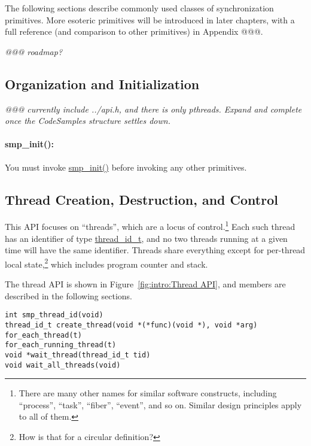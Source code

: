 The following sections describe commonly used classes of synchronization
primitives.
More esoteric primitives will be introduced in later chapters, with
a full reference (and comparison to other primitives) in
Appendix @@@.

\emph{@@@ roadmap?}

\subsection{Organization and Initialization}
\label{sec:intro:Organization and Initialization}

\emph{@@@ currently include ../api.h, and there is only pthreads.
Expand and complete once the CodeSamples structure settles down.}

\paragraph{smp\_init():}
You must invoke \url{smp_init()} before invoking any other primitives.

\subsection{Thread Creation, Destruction, and Control}
\label{sec:intro:Thread Creation, Destruction and Control}

This API focuses on ``threads'', which are a locus of control.\footnote{
	There are many other names for similar software constructs, including
	``process'', ``task'', ``fiber'', ``event'', and so on.
	Similar design principles apply to all of them.}
Each such thread has an identifier of type \url{thread_id_t},
and no two threads running at a given time will have the same
identifier.
Threads share everything except for per-thread local state,\footnote{
	How is that for a circular definition?}
which includes program counter and stack.

The thread API is shown in
Figure~\ref{fig:intro:Thread API}, and members are described in the
following sections.

\begin{figure*}[htbp] 
{ \scriptsize
\begin{verbatim}
int smp_thread_id(void)
thread_id_t create_thread(void *(*func)(void *), void *arg)
for_each_thread(t)
for_each_running_thread(t)
void *wait_thread(thread_id_t tid)
void wait_all_threads(void)
\end{verbatim}
}
\caption{Thread API}
\label{fig:intro:Thread API}
\end{figure*}

